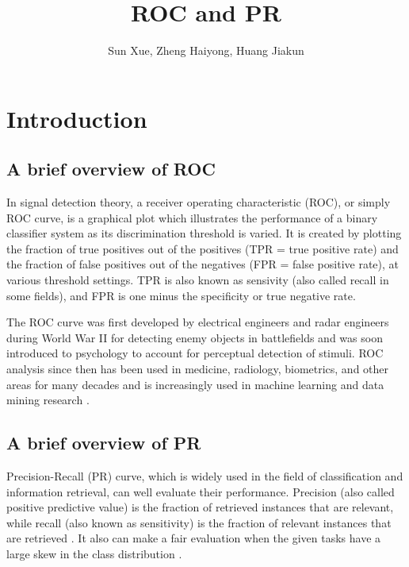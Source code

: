 \documentclass[a4paper,12pt]{article}
\author{Sun Xue, Zheng Haiyong, Huang Jiakun}
\title{ROC and PR}
\begin{document}
\maketitle
\tableofcontents
\newpage
\section{Introduction}

\subsection{A brief overview of ROC}
In signal detection theory, a receiver operating characteristic (ROC), or simply ROC curve, is a graphical plot which illustrates the performance of a binary classifier system as its discrimination threshold is varied. It is created by plotting the fraction of true positives out of the positives (TPR = true positive rate) and the fraction of false positives out of the negatives (FPR = false positive rate), at various threshold settings. TPR is also known as sensivity (also called recall in some fields), and FPR is one minus the specificity or true negative rate.

The ROC curve was first developed by electrical engineers and radar engineers during World War II for detecting enemy objects in battlefields and was soon introduced to psychology to account for perceptual detection of stimuli. ROC analysis since then has been used in medicine, radiology, biometrics, and other areas for many decades and is increasingly used in machine learning and data mining research \cite{1:misc}.

\subsection{A brief overview of PR}
Precision-Recall (PR) curve, which is widely used in the field of classification and information retrieval, can well evaluate their performance. Precision (also called positive predictive value) is the fraction of retrieved instances that are relevant, while recall (also known as sensitivity) is the fraction of relevant instances that are retrieved \cite{2:misc}. It also can make a fair evaluation when the given tasks have a large skew in the class distribution \cite{3:article}.
\end{document}
